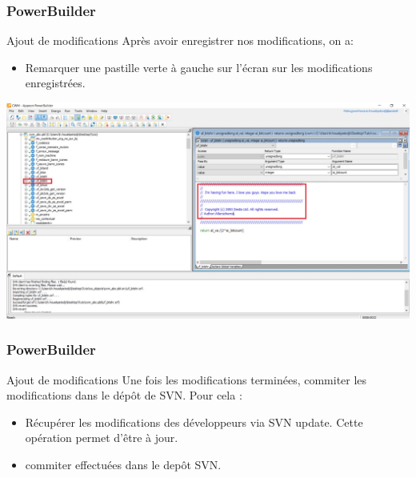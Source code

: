 \documentclass{beamer}
\begin{document}
\begin{frame}
\frametitle{PowerBuilder}
\begin{block}{Ajout de modifications}
Après avoir enregistrer nos modifications, on a:
\begin{itemize}
\item Remarquer une pastille verte  à gauche sur l'écran  sur les modifications enregistrées.
\end{itemize}
\end{block}
 
\includegraphics[scale=.2]{../images/modif2.jpg}
\end{frame}

\begin{frame}
\frametitle{PowerBuilder}
\begin{block}{Ajout de modifications}
Une fois les modifications terminées, commiter les modifications dans le dépôt de SVN.  Pour cela :
\begin{itemize}
\item Récupérer les modifications des développeurs via \alert{SVN update}. Cette opération permet d'être à jour. 
\item commiter effectuées dans le depôt SVN.
\end{itemize} 
\end{block}
\end{frame}
\end{document}
